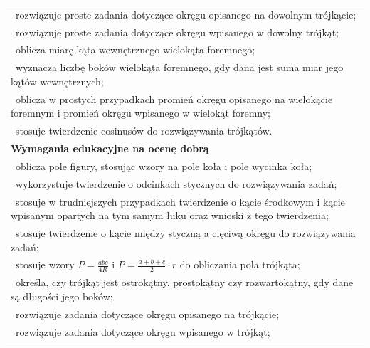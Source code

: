\documentclass[12pt,a4paper]{article}
\begin{document}
\begin{longtable}{|p{16cm}|}
		\textbullet\ rozwiązuje proste zadania dotyczące okręgu opisanego na dowolnym trójkącie; \\
		
		\textbullet\ rozwiązuje proste zadania dotyczące okręgu wpisanego w dowolny trójkąt; \\
		
		\textbullet\ oblicza miarę kąta wewnętrznego wielokąta foremnego; \\
		
		\textbullet\ wyznacza liczbę boków wielokąta foremnego, gdy dana jest suma miar jego kątów wewnętrznych; \\
		
		\textbullet\ oblicza w prostych przypadkach promień okręgu opisanego na wielokącie foremnym i promień okręgu wpisanego w wielokąt foremny; \\
		
		\textbullet\ stosuje twierdzenie cosinusów do rozwiązywania trójkątów. \\ \hline
		
		\textbf{Wymagania edukacyjne na ocenę dobrą} \\ \hline
		
		\textbullet\ oblicza pole figury, stosując wzory na pole koła i pole wycinka koła; \\
		
		\textbullet\ wykorzystuje twierdzenie o odcinkach stycznych do rozwiązywania zadań; \\
		
		\textbullet\ stosuje w trudniejszych przypadkach twierdzenie o kącie środkowym i kącie wpisanym opartych na tym samym łuku oraz wnioski z tego twierdzenia; \\
		
		\textbullet\ stosuje twierdzenie o kącie między styczną a cięciwą okręgu do rozwiązywania zadań; \\
		
		\textbullet\ stosuje wzory $P=\frac{abc}{4R}$ i $P=\frac{a+b+c}{2}\cdot r$ do obliczania pola trójkąta; \\
		
		\textbullet\ określa, czy trójkąt jest ostrokątny, prostokątny czy rozwartokątny, gdy dane są długości jego boków; \\
		
		\textbullet\ rozwiązuje zadania dotyczące okręgu opisanego na trójkącie; \\
		
		\textbullet\ rozwiązuje zadania dotyczące okręgu wpisanego w trójkąt; \\
		

\end{longtable}
\end{document}
